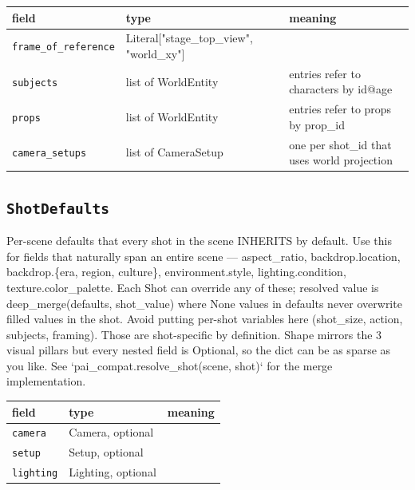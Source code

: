 \begin{longtable}{@{}R{0.24\textwidth}R{0.21\textwidth}R{0.49\textwidth}@{}}
\toprule \textbf{field} & \textbf{type} & \textbf{meaning} \\ \midrule
\endhead
\texttt{frame\_\allowbreak of\_\allowbreak reference} & Literal["stage\_\allowbreak top\_\allowbreak view", \allowbreak "world\_\allowbreak xy"] &  \\
\texttt{subjects} & list of WorldEntity & entries refer to characters by id@age \\
\texttt{props} & list of WorldEntity & entries refer to props by prop\_\allowbreak id \\
\texttt{camera\_\allowbreak setups} & list of CameraSetup & one per shot\_\allowbreak id that uses world projection \\
\bottomrule
\end{longtable}

\subsection*{\texttt{ShotDefaults}}
\noindent Per-scene defaults that every shot in the scene INHERITS by default. Use this for fields that naturally span an entire scene ---\allowbreak{} aspect\_\allowbreak ratio, backdrop.location, backdrop.\{era, region, culture\}, environment.style, lighting.condition, texture.color\_\allowbreak palette. Each Shot can override any of these; resolved value is deep\_\allowbreak merge(defaults, shot\_\allowbreak value) where None values in defaults never overwrite filled values in the shot. Avoid putting per-shot variables here (shot\_\allowbreak size, action, subjects, framing). Those are shot-specific by definition. Shape mirrors the 3 visual pillars but every nested field is Optional, so the dict can be as sparse as you like. See `pai\_\allowbreak compat.resolve\_\allowbreak shot(scene, shot)` for the merge implementation.

\begin{longtable}{@{}R{0.24\textwidth}R{0.21\textwidth}R{0.49\textwidth}@{}}
\toprule \textbf{field} & \textbf{type} & \textbf{meaning} \\ \midrule
\endhead
\texttt{camera} & Camera, optional &  \\
\texttt{setup} & Setup, optional &  \\
\texttt{lighting} & Lighting, optional &  \\
\bottomrule
\end{longtable}

